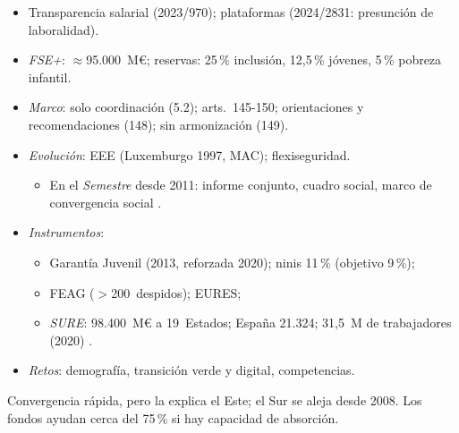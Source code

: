 \documentclass{article}
\begin{document}
\begin{columnas}
\begin{itemize}
  \begin{itemize}
  \item TJUE C-19/23 (11-11-2025): anula el art.~5.2~y parte del 5.3; el resto vale.
  \end{itemize}
\item Transparencia salarial (2023/970); plataformas (2024/2831: presunción de laboralidad).
\item \emph{FSE+}: $\approx$95.000~M€; reservas: 25\,\% inclusión, 12,5\,\% jóvenes, 5\,\% pobreza infantil.
\end{itemize}

\begin{itemize}
\item \emph{Marco}: solo coordinación (5.2); arts.~145-150; orientaciones y recomendaciones (148); sin armonización (149).
\item \emph{Evolución}: EEE (Luxemburgo 1997, MAC); flexiseguridad.
  \begin{itemize}
  \item En el \emph{Semestre} desde 2011: informe conjunto, cuadro social, marco de convergencia social .
  \end{itemize}
\item \emph{Instrumentos}:
  \begin{itemize}
  \item Garantía Juvenil (2013, reforzada 2020); ninis 11\,\% (objetivo 9\,\%);
  \item FEAG ($>$200~despidos); EURES;
  \item \emph{SURE}: 98.400~M€ a 19~Estados; España 21.324; 31,5~M de trabajadores (2020) .
  \end{itemize}
\item \emph{Retos}: demografía, transición verde y digital, competencias.
\end{itemize}

\begin{ideaclave}
Convergencia rápida, pero la explica el Este; el Sur se aleja desde 2008. Los fondos ayudan cerca del 75\,\% si hay capacidad de absorción.
\end{ideaclave}


\end{columnas}
\end{document}
